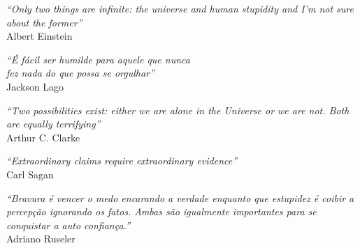 \documentclass[english]{ufsc-inep-thesis}
\begin{document}

\begin{epigrafe}
	\vspace*{\fill}
	\begin{flushright}
		\textit{``Only two things are infinite: the universe and human stupidity and I'm not sure about the former''}\\Albert Einstein
	\end{flushright}
	\begin{flushright}
		\textit{``É fácil ser humilde para aquele que nunca\\ fez nada do que possa se orgulhar''}\\Jackson Lago
	\end{flushright}
	\begin{flushright}
		\textit{``Two possibilities exist: either we are alone in the Universe or we are not. Both are equally terrifying''}\\
		Arthur C. Clarke
	\end{flushright}
	\begin{flushright}
		\textit{``Extraordinary claims require extraordinary evidence''}\\
		Carl Sagan
	\end{flushright}
	\begin{flushright}
		\textit{``Bravura é vencer o medo encarando a verdade enquanto que estupidez é coibir a percepção ignorando os fatos. Ambas são igualmente importantes para se conquistar a auto confiança.''}\\
		Adriano Ruseler
	\end{flushright}
\end{epigrafe}

\setlength{\absparsep}{18pt} %




\listoffigures*
\cleardoublepage

\listoftables*
\cleardoublepage





\tableofcontents*
\cleardoublepage
\end{document}

